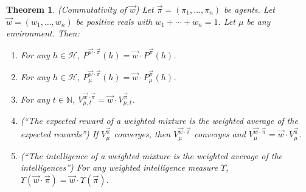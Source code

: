 \documentclass[twoside]{article}
\newtheorem{theorem}{Theorem}
\begin{document}
\begin{theorem}
\label{maintheorem}
    (Commutativity of $\vec w$)
    Let $\vec\pi=(\pi_1,\ldots,\pi_n)$ be agents.
    Let $\vec w=(w_1,\ldots,w_n)$ be positive reals with
    $w_1+\cdots+w_n=1$. Let $\mu$ be any environment.
    Then:
    \begin{enumerate}
        \item
        For any $h\in\mathcal H$,
        $P^{\vec w\cdot \vec\pi}(h)=\vec w\cdot {P^{\vec\pi}}(h)$.
        \item
        For any $h\in\mathcal H$,
        $P^{\vec w\cdot \vec\pi}_\mu(h)=\vec w \cdot P^{\vec\pi}_\mu(h)$.
        \item
        For any $t\in\mathbb N$,
        $V^{\vec w\cdot \vec\pi}_{\mu,t}=\vec w\cdot V^{\vec\pi}_{\mu,t}$.
        \item
        (``The expected reward of a weighted mixture is the weighted
        average of the expected rewards'')
        If $V^{\vec\pi}_\mu$ converges, then $V^{\vec w\cdot\vec\pi}_\mu$
        converges and $V^{\vec w\cdot\vec\pi}_\mu=\vec w\cdot V^{\vec\pi}_\mu$.
        \item
        (``The intelligence of a weighted mixture is the weighted average
        of the intelligences'')
        For any weighted intelligence measure $\Upsilon$,
        $\Upsilon(\vec w\cdot\vec\pi)=\vec w\cdot\Upsilon(\vec\pi)$.
    \end{enumerate}
\end{theorem}
\end{document}
